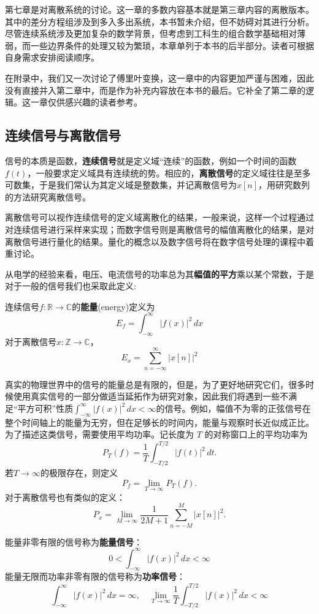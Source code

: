 第七章是对离散系统的讨论。这一章的多数内容基本就是第三章内容的离散版本。其中的差分方程组涉及到多入多出系统，本书暂未介绍，但不妨碍对其进行分析。尽管连续系统涉及更加复杂的数学背景，但考虑到工科生的组合数学基础相对薄弱，而一些边界条件的处理又较为繁琐，本章单列于本书的后半部分。读者可根据自身需求安排阅读顺序。

在附录中，我们又一次讨论了傅里叶变换，这一章中的内容更加严谨与困难，因此没有直接并入第二章中，而是作为补充内容放在本书的最后。它补全了第二章的逻辑。这一章仅供感兴趣的读者参考。

\subsection{连续信号与离散信号}\label{sub:signal}
信号的本质是函数，\textbf{连续信号}就是定义域“连续”的函数，例如一个时间的函数$f(t)$，一般要求定义域具有连续统的势。相应的，\textbf{离散信号}的定义域往往是至多可数集，于是我们常认为其定义域是整数集，并记离散信号为$x[n]$，用研究数列的方法研究离散信号。

离散信号可以视作连续信号的定义域离散化的结果，一般来说，这样一个过程通过对连续信号进行采样来实现；而数字信号则是离散信号的幅值离散化的结果，是对离散信号进行量化的结果。量化的概念以及数字信号将在数字信号处理的课程中着重讨论。

从电学的经验来看，电压、电流信号的功率总为其\textbf{幅值的平方}乘以某个常数，于是对于一般的信号我们也采取此定义:

\begin{definition}[能量]
    连续信号$f:\mathbb{R}\to\mathbb{C}$的\textbf{能量}(energy)定义为
    $$E_f=\int_{-\infty}^{\infty}| f(x)| ^2\,dx$$
    对于离散信号$x:\mathbb{Z}\to\mathbb{C}$，
    $$E_x=\sum_{n = -\infty}^{\infty}  |x[n]| ^2$$
\end{definition}

真实的物理世界中的信号的能量总是有限的，但是，为了更好地研究它们，很多时候使用真实信号的一部分做适当延拓作为研究对象，因此我们将遇到一些不满足“平方可积”性质$\int_{-\infty}^{\infty}| f(x)| ^2\,dx<\infty$的信号。例如，幅值不为零的正弦信号在整个时间轴上的能量为无穷，但在足够长的时间内，能量与观察时长近似成正比。为了描述这类信号，需要使用平均功率。记长度为 $T$ 的对称窗口上的平均功率为
$$
    P_T(f)=\frac1T\int_{-T/2}^{T/2}|f(t)|^2\,dt.
$$
若$T\to\infty$的极限存在，则定义
$$
    P_f=\lim_{T\to\infty}P_T(f).
$$
对于离散信号也有类似的定义：
$$P_x=\lim_{M\to\infty}\frac{1}{2M+1}\sum_{n=-M}^M |x[n]|^2.$$
\begin{definition}[能量信号与功率信号]
    能量非零有限的信号称为\textbf{能量信号}：
    \[0<\int_{-\infty}^{\infty}|f(x)|^2\,dx<\infty\]
    能量无限而功率非零有限的信号称为\textbf{功率信号}：
    \[\int_{-\infty}^{\infty}|f(x)|^2\,dx=\infty,\quad\lim_{T \to \infty}\frac{1}{T}\int_{-T/2}^{T/2}| f(x)|^2  \,dx<\infty\]
\end{definition}

